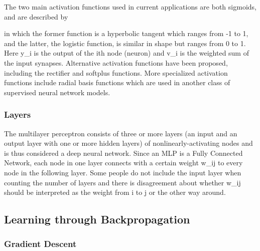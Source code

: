 The two main activation functions used in current applications are both sigmoids, and are described by


in which the former function is a hyperbolic tangent which ranges from -1 to 1, and the latter, the logistic function, is similar in shape but ranges from 0 to 1. Here y_i is the output of the ith node (neuron) and v_i is the weighted sum of the input synapses. Alternative activation functions have been proposed, including the rectifier and softplus functions. More specialized activation functions include radial basis functions which are used in another class of supervised neural network models.

\subsubsection{Layers}
The multilayer perceptron consists of three or more layers (an input and an output layer with one or more hidden layers) of nonlinearly-activating nodes and is thus considered a deep neural network. Since an MLP is a Fully Connected Network, each node in one layer connects with a certain weight w_{ij} to every node in the following layer. Some people do not include the input layer when counting the number of layers and there is disagreement about whether w_{ij} should be interpreted as the weight from i to j or the other way around.

\subsection{Learning through Backpropagation} \label{ssec:backprop}


\subsubsection{Gradient Descent}
